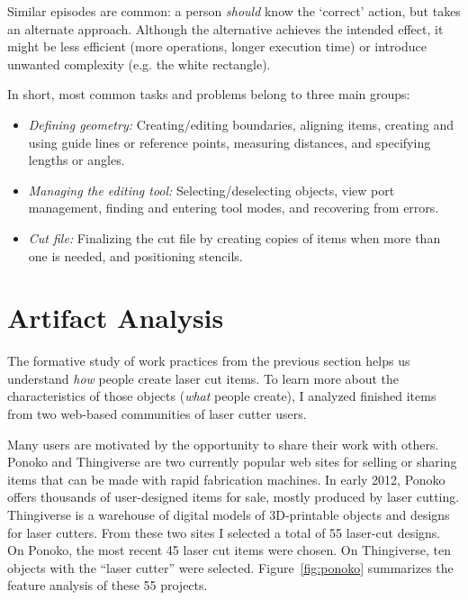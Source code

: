 Similar episodes are common: a person \textit{should} know the
`correct' action, but takes an alternate approach. Although the
alternative achieves the intended effect, it might be less efficient
(more operations, longer execution time) or introduce unwanted
complexity (e.g. the white rectangle).

In short, most common tasks and problems belong to three main groups:

\begin{itemize}
\item \textit{Defining geometry:} Creating/editing boundaries,
  aligning items, creating and using guide lines or reference points,
  measuring distances, and specifying lengths or angles.
\item \textit{Managing the editing tool:} Selecting/deselecting
  objects, view port management, finding and entering tool modes, and
  recovering from errors.
\item \textit{Cut file:} Finalizing the cut file by creating copies of
  items when more than one is needed, and positioning stencils.
\end{itemize}

\section{Artifact Analysis}
\label{sec:formative-artifact}

The formative study of work practices from the previous section helps
us understand \textit{how} people create laser cut items. To learn
more about the characteristics of those objects (\textit{what} people
create), I analyzed finished items from two web-based communities of
laser cutter users.

Many users are motivated by the opportunity to share their work with
others. Ponoko and Thingiverse are two currently popular web sites for
selling or sharing items that can be made with rapid fabrication
machines. In early 2012, Ponoko offers thousands of user-designed
items for sale, mostly produced by laser cutting. Thingiverse is a
warehouse of digital models of 3D-printable objects and designs for
laser cutters. From these two sites I selected a total of 55 laser-cut
designs. On Ponoko, the most recent 45 laser cut items were chosen.
On Thingiverse, ten objects with the ``laser cutter'' were
selected. Figure~\ref{fig:ponoko} summarizes the feature analysis of
these 55 projects.



